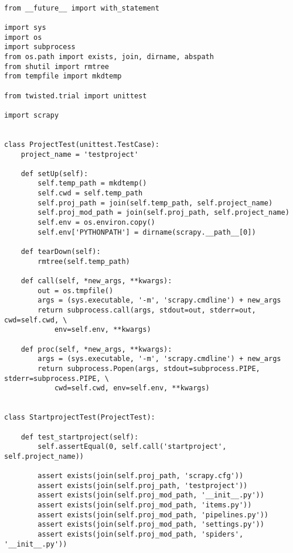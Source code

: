 
\pagebreak

\begin{lstlisting}

from __future__ import with_statement

import sys
import os
import subprocess
from os.path import exists, join, dirname, abspath
from shutil import rmtree
from tempfile import mkdtemp

from twisted.trial import unittest

import scrapy


class ProjectTest(unittest.TestCase):
    project_name = 'testproject'

    def setUp(self):
        self.temp_path = mkdtemp()
        self.cwd = self.temp_path
        self.proj_path = join(self.temp_path, self.project_name)
        self.proj_mod_path = join(self.proj_path, self.project_name)
        self.env = os.environ.copy()
        self.env['PYTHONPATH'] = dirname(scrapy.__path__[0])

    def tearDown(self):
        rmtree(self.temp_path)

    def call(self, *new_args, **kwargs):
        out = os.tmpfile()
        args = (sys.executable, '-m', 'scrapy.cmdline') + new_args
        return subprocess.call(args, stdout=out, stderr=out, cwd=self.cwd, \
            env=self.env, **kwargs)

    def proc(self, *new_args, **kwargs):
        args = (sys.executable, '-m', 'scrapy.cmdline') + new_args
        return subprocess.Popen(args, stdout=subprocess.PIPE, stderr=subprocess.PIPE, \
            cwd=self.cwd, env=self.env, **kwargs)


class StartprojectTest(ProjectTest):

    def test_startproject(self):
        self.assertEqual(0, self.call('startproject', self.project_name))

        assert exists(join(self.proj_path, 'scrapy.cfg'))
        assert exists(join(self.proj_path, 'testproject'))
        assert exists(join(self.proj_mod_path, '__init__.py'))
        assert exists(join(self.proj_mod_path, 'items.py'))
        assert exists(join(self.proj_mod_path, 'pipelines.py'))
        assert exists(join(self.proj_mod_path, 'settings.py'))
        assert exists(join(self.proj_mod_path, 'spiders', '__init__.py'))


\end{lstlisting}
